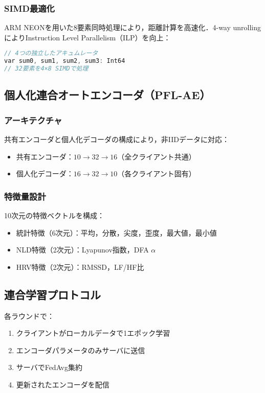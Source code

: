 \documentclass[paper]{ieice}
\begin{document}
\subsubsection{SIMD最適化}
ARM NEONを用いた8要素同時処理により，距離計算を高速化．4-way unrollingによりInstruction Level Parallelism（ILP）を向上：

\begin{lstlisting}[language=C]
// 4つの独立したアキュムレータ
var sum0, sum1, sum2, sum3: Int64
// 32要素を4×8 SIMDで処理
\end{lstlisting}

\subsection{個人化連合オートエンコーダ（PFL-AE）}

\subsubsection{アーキテクチャ}
共有エンコーダと個人化デコーダの構成により，非IIDデータに対応：

\begin{itemize}
\item 共有エンコーダ：$10 \rightarrow 32 \rightarrow 16$（全クライアント共通）
\item 個人化デコーダ：$16 \rightarrow 32 \rightarrow 10$（各クライアント固有）
\end{itemize}

\subsubsection{特徴量設計}
10次元の特徴ベクトルを構成：
\begin{itemize}
\item 統計特徴（6次元）：平均，分散，尖度，歪度，最大値，最小値
\item NLD特徴（2次元）：Lyapunov指数，DFA $\alpha$
\item HRV特徴（2次元）：RMSSD，LF/HF比
\end{itemize}

\subsection{連合学習プロトコル}
各ラウンドで：
\begin{enumerate}
\item クライアントがローカルデータで1エポック学習
\item エンコーダパラメータのみサーバに送信
\item サーバでFedAvg集約
\item 更新されたエンコーダを配信
\end{enumerate}
\end{document}
